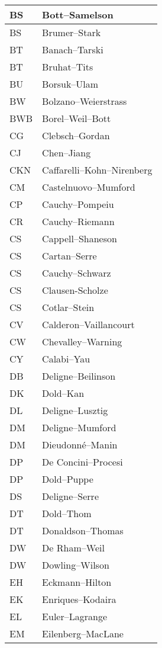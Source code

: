\documentclass{amsart}
\numberwithin{equation}{section}
\theoremstyle{plain}
\numberwithin{equation}{section}
\theoremstyle{remark}
\begin{document}
\begin{longtable}{l|l}
BS & Bott--Samelson\\ \hline
BS & Brumer--Stark\\ \hline
BT & Banach--Tarski\\ \hline
BT & Bruhat--Tits\\ \hline
BU & Borsuk--Ulam\\ \hline
BW & Bolzano--Weierstrass\\ \hline
BWB & Borel--Weil--Bott\\ \hline
CG & Clebsch--Gordan\\ \hline
CJ & Chen--Jiang\\ \hline
CKN & Caffarelli--Kohn--Nirenberg\\ \hline
CM & Castelnuovo--Mumford\\ \hline
CP &  Cauchy--Pompeiu\\ \hline
CR & Cauchy--Riemann\\ \hline
CS & Cappell--Shaneson\\ \hline
CS & Cartan--Serre\\ \hline
CS & Cauchy--Schwarz\\ \hline
CS & Clausen-Scholze\\ \hline
CS & Cotlar--Stein\\ \hline
CV & Calderon--Vaillancourt\\ \hline
CW & Chevalley--Warning\\ \hline
CY & Calabi--Yau\\ \hline
DB & Deligne--Beilinson\\ \hline
DK & Dold--Kan\\ \hline
DL & Deligne--Lusztig\\ \hline
DM & Deligne--Mumford\\ \hline
DM & Dieudonné--Manin\\ \hline
DP & De Concini--Procesi\\ \hline
DP & Dold--Puppe\\ \hline
DS & Deligne--Serre \\ \hline
DT & Dold--Thom\\ \hline
DT & Donaldson--Thomas\\ \hline
DW & De Rham--Weil\\ \hline
DW & Dowling--Wilson\\ \hline
EH & Eckmann--Hilton\\ \hline
EK & Enriques--Kodaira\\ \hline
EL & Euler--Lagrange\\ \hline
EM & Eilenberg--MacLane\\ \hline

\end{longtable}
\end{document}
